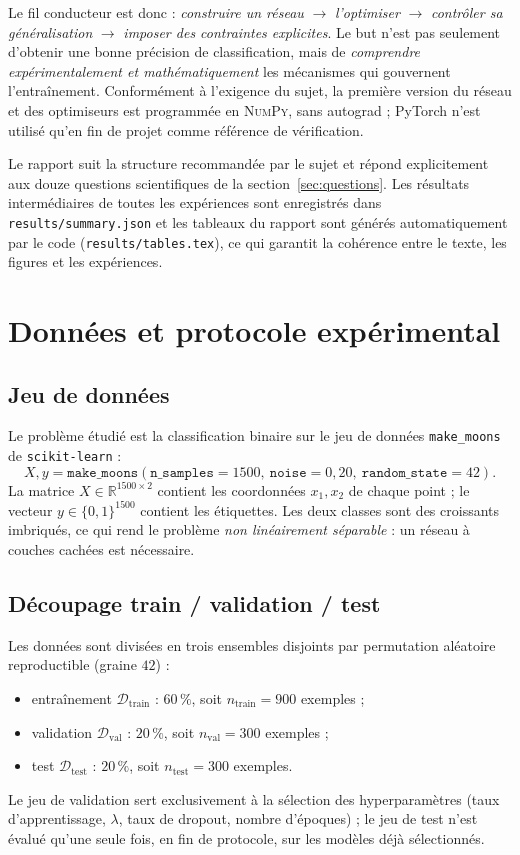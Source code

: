 \documentclass[11pt,a4paper]{article}
\newcommand{\R}{\mathbb{R}}
\begin{document}
Le fil conducteur est donc : \emph{construire un réseau} $\to$ \emph{l'optimiser} $\to$ \emph{contrôler sa généralisation} $\to$ \emph{imposer des contraintes explicites}. Le but n'est pas seulement d'obtenir une bonne précision de classification, mais de \emph{comprendre expérimentalement et mathématiquement} les mécanismes qui gouvernent l'entraînement. Conformément à l'exigence du sujet, la première version du réseau et des optimiseurs est programmée en \textsc{NumPy}, sans autograd ; PyTorch n'est utilisé qu'en fin de projet comme référence de vérification.

Le rapport suit la structure recommandée par le sujet et répond explicitement aux douze questions scientifiques de la section~\ref{sec:questions}. Les résultats intermédiaires de toutes les expériences sont enregistrés dans \texttt{results/summary.json} et les tableaux du rapport sont générés automatiquement par le code (\texttt{results/tables.tex}), ce qui garantit la cohérence entre le texte, les figures et les expériences.

\section{Données et protocole expérimental}
\label{sec:data}

\subsection{Jeu de données}

Le problème étudié est la classification binaire sur le jeu de données \texttt{make\_moons} de \texttt{scikit-learn} :
\[
X, y = \texttt{make\_moons}(\texttt{n\_samples}=1500,\ \texttt{noise}=0{,}20,\ \texttt{random\_state}=42).
\]
La matrice $X \in \R^{1500 \times 2}$ contient les coordonnées $x_1, x_2$ de chaque point ; le vecteur $y \in \{0,1\}^{1500}$ contient les étiquettes. Les deux classes sont des croissants imbriqués, ce qui rend le problème \emph{non linéairement séparable} : un réseau à couches cachées est nécessaire.

\subsection{Découpage train / validation / test}

Les données sont divisées en trois ensembles disjoints par permutation aléatoire reproductible (graine $42$) :
\begin{itemize}
  \item entraînement $\mathcal{D}_{\mathrm{train}}$ : $60\,\%$, soit $n_{\mathrm{train}} = 900$ exemples ;
  \item validation $\mathcal{D}_{\mathrm{val}}$ : $20\,\%$, soit $n_{\mathrm{val}} = 300$ exemples ;
  \item test $\mathcal{D}_{\mathrm{test}}$ : $20\,\%$, soit $n_{\mathrm{test}} = 300$ exemples.
\end{itemize}
Le jeu de validation sert exclusivement à la sélection des hyperparamètres (taux d'apprentissage, $\lambda$, taux de dropout, nombre d'époques) ; le jeu de test n'est évalué qu'une seule fois, en fin de protocole, sur les modèles déjà sélectionnés.
\end{document}
